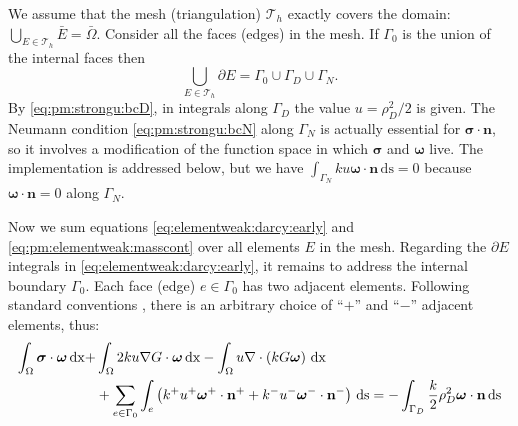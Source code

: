 \documentclass[11pt]{amsart}
\newcommand{\bn}{\mathbf{n}}
\newcommand{\bsigma}{\bm{\sigma}}
\newcommand{\bomega}{\bm{\omega}}
\newcommand{\cT}{\mathcal{T}}
\newcommand{\dx}{\mathrm{dx}}
\newcommand{\ds}{\mathrm{ds}}
\newcommand{\Div}{\nabla\cdot}
\newcommand{\grad}{\nabla}
\begin{document}
We assume that the mesh (triangulation) $\cT_h$ exactly covers the domain: $\bigcup_{E\in\cT_h} \bar E = \bar \Omega$.  Consider all the faces (edges) in the mesh.  If $\Gamma_0$ is the union of the internal faces then
\begin{equation}
\bigcup_{E\in\cT_h} \partial E = \Gamma_0 \cup \Gamma_D \cup \Gamma_N.
\end{equation}
By \eqref{eq:pm:strongu:bcD}, in integrals along $\Gamma_D$ the value $u=\rho_D^2/2$ is given.  The Neumann condition \eqref{eq:pm:strongu:bcN} along $\Gamma_N$ is actually essential for $\bsigma\cdot\bn$, so it involves a modification of the function space in which $\bsigma$ and $\bomega$ live.  The implementation is addressed below, but we have $\int_{\Gamma_N} k u \bomega\cdot\bn\,\ds = 0$ because $\bomega\cdot\bn=0$ along $\Gamma_N$.

Now we sum equations \eqref{eq:elementweak:darcy:early} and \eqref{eq:pm:elementweak:masscont} over all elements $E$ in the mesh.  Regarding the $\partial E$ integrals in \eqref{eq:elementweak:darcy:early}, it remains to address the internal boundary $\Gamma_0$.  Each face (edge) $e \in \Gamma_0$ has two adjacent elements.  Following standard conventions \citep{Arnold2002,Ham2023}, there is an arbitrary choice of ``$+$'' and ``$-$'' adjacent elements, thus:
\begin{align}
\int_\Omega \bsigma\cdot \bomega\,\dx + &\int_\Omega 2 k u \grad G \cdot \bomega\,\dx - \int_\Omega u \Div\left(k G \bomega\right)\,\dx  \label{eq:elementweak:darcy:second} \\
&+ \sum_{e\in\Gamma_0} \int_e \left(k^+ u^+ \bomega^+\cdot\bn^+ + k^- u^- \bomega^-\cdot\bn^-\right)\,\ds = - \int_{\Gamma_D} \frac{k}{2} \rho_D^2 \bomega\cdot\bn\,\ds \notag
\end{align}
\end{document}
